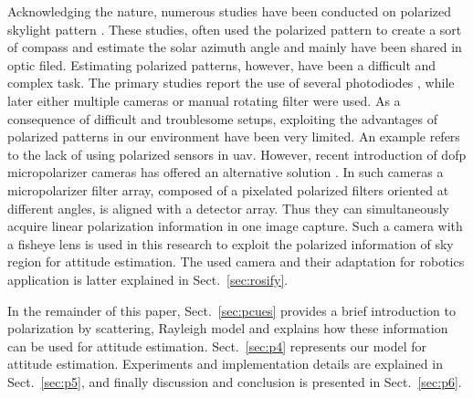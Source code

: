 Acknowledging the nature, numerous studies have been conducted on polarized
skylight pattern \cite{lambrinos2000insectnavigation, chu2009application,
  zhao2009novel, wang2015novel,chahl2013integration, ashkanazy2015bio,
  sturzl2012fisheye, ma2015skylightpolarization,
  miyazaki09sunlightpolarization, wang2014bionic,
  lu2015angle,hamaoui2017polarized}.  These studies, often used the polarized
pattern to create a sort of compass and estimate the solar azimuth angle and
mainly have been shared in optic filed.  Estimating polarized patterns,
however, have been a difficult and complex task.  The primary studies report
the use of several photodiodes \cite{lambrinos2000insectnavigation,
  chu2009application, zhao2009novel, wang2015novel,chahl2013integration}, while
later either multiple cameras \cite{ashkanazy2015bio, sturzl2012fisheye,
  wang2014bionic} or manual rotating filter \cite{ma2015skylightpolarization,
  miyazaki09sunlightpolarization, lu2015angle, hamaoui2017polarized} were used.
As a consequence of difficult and troublesome setups, exploiting the advantages
of polarized patterns in our environment have been very limited. An example
refers to the lack of using polarized sensors in \gls{uav}.  However, recent
introduction of \gls{dofp} micropolarizer cameras has offered an alternative
solution \cite{nordin1999micropolarizer, nordin1999diffractive,
  millerd2006pixelated}.  In such cameras a micropolarizer filter array,
composed of a pixelated polarized filters oriented at different angles, is
aligned with a detector array. Thus they can simultaneously acquire linear
polarization information in one image capture.  Such a camera with a fisheye
lens is used in this research to exploit the polarized information of sky
region for attitude estimation.  The used camera and their adaptation for
robotics application is latter explained in Sect.~\ref{sec:rosify}.

In the remainder of this paper, Sect.~\ref{sec:pcues} provides a brief
introduction to polarization by scattering, Rayleigh model and explains how
these information can be used for attitude estimation. Sect.~\ref{sec:p4}
represents our model for attitude estimation. Experiments and implementation
details are explained in Sect.~\ref{sec:p5}, and finally discussion and
conclusion is presented in Sect.~\ref{sec:p6}.

























